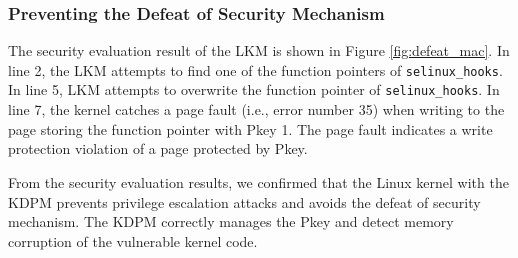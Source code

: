 \subsubsection{Preventing the Defeat of Security Mechanism}
The security evaluation result of the LKM is shown in Figure
\ref{fig:defeat_mac}.
In line 2, the LKM attempts to find one of the function pointers of
\verb|selinux_hooks|. In line 5, LKM attempts to overwrite the function pointer of
\verb|selinux_hooks|.
In line 7, the kernel catches a page fault (i.e., error number 35) when writing
to the page storing the function pointer with Pkey 1. The page fault
indicates a write protection violation of a page protected by Pkey.

%

From the security evaluation results, we confirmed that the Linux kernel with the
KDPM prevents privilege escalation attacks and avoids the defeat of security mechanism.
The KDPM correctly manages the Pkey and detect
memory corruption of the vulnerable kernel code.


